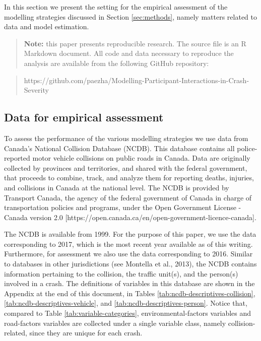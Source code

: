 \documentclass[]{elsarticle} %
\begin{document}
In this section we present the setting for the empirical assessment of
the modelling strategies discussed in Section \ref{sec:methods}, namely
matters related to data and model estimation.

\begin{quote}
\textbf{Note:} this paper presents reproducible research. The source
file is an R Markdown document. All code and data necessary to reproduce
the analysis are available from the following GitHub repository:
\end{quote}

\begin{quote}
https://github.com/paezha/Modelling-Participant-Interactions-in-Crash-Severity
\end{quote}

\hypertarget{sec:data}{%
\subsection{Data for empirical assessment}\label{sec:data}}

To assess the performance of the various modelling strategies we use
data from Canada's National Collision Database (NCDB). This database
contains all police-reported motor vehicle collisions on public roads in
Canada. Data are originally collected by provinces and territories, and
shared with the federal government, that proceeds to combine, track, and
analyze them for reporting deaths, injuries, and collisions in Canada at
the national level. The NCDB is provided by Transport Canada, the agency
of the federal government of Canada in charge of transportation policies
and programs, under the Open Government License - Canada version 2.0
{[}https://open.canada.ca/en/open-government-licence-canada{]}.

The NCDB is available from 1999. For the purpose of this paper, we use
the data corresponding to 2017, which is the most recent year available
as of this writing. Furthermore, for assessment we also use the data
corresponding to 2016. Similar to databases in other jurisdictions (see
Montella et al., 2013), the NCDB contains information pertaining to the
collision, the traffic unit(s), and the person(s) involved in a crash.
The definitions of variables in this database are shown in the Appendix
at the end of this document, in Tables
\ref{tab:ncdb-descriptives-collision},
\ref{tab:ncdb-descriptives-vehicle}, and
\ref{tab:ncdb-descriptives-person}. Notice that, compared to Table
\ref{tab:variable-categories}, environmental-factors variables and
road-factors variables are collected under a single variable class,
namely collision-related, since they are unique for each crash.
\end{document}
